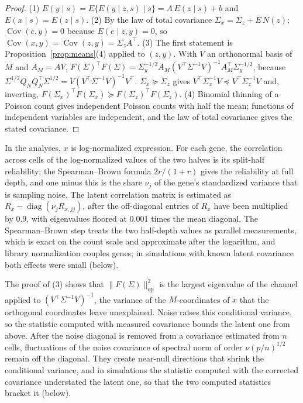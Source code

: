 \begin{proof}
(1) $E(y\mid s)=E\{E(y\mid z,s)\mid s\}=A\,E(z\mid s)+b$ and
$E(x\mid s)=E(z\mid s)$. (2) By the law of total covariance
$\Sigma_x=\Sigma_z+E\,N(z)$; $\operatorname{Cov}(e,y)=0$ because
$E(e\mid z,y)=0$, so $\operatorname{Cov}(x,y)=\operatorname{Cov}(z,y)
=\Sigma_zA^\top$. (3) The first statement is Proposition~\ref{prop:means}(4)
applied to $(z,y)$. With $V$ an orthonormal basis of $M$ and $A_M=AV$,
$F(\Sigma)^\top F(\Sigma)=\Sigma_y^{-1/2}A_M(V^\top\Sigma^{-1}V)^{-1}A_M^\top\Sigma_y^{-1/2}$,
because $\Sigma^{1/2}Q_NQ_N^\top\Sigma^{1/2}=V(V^\top\Sigma^{-1}V)^{-1}V^\top$.
$\Sigma_x\succeq\Sigma_z$ gives $V^\top\Sigma_x^{-1}V\preceq V^\top\Sigma_z^{-1}V$
and, inverting, $F(\Sigma_x)^\top F(\Sigma_x)\succeq F(\Sigma_z)^\top F(\Sigma_z)$.
(4) Binomial thinning of a Poisson count gives independent Poisson counts with
half the mean; functions of independent variables are independent, and the
law of total covariance gives the stated covariance.
\end{proof}

In the analyses, $x$ is log-normalized expression. For each gene, the
correlation across cells of the log-normalized values of the two halves is its
split-half reliability; the Spearman--Brown formula $2r/(1+r)$ gives the
reliability at full depth, and one minus this is the share $\nu_j$ of the
gene's standardized variance that is sampling noise. The latent correlation
matrix is estimated as $R_x-\operatorname{diag}(\nu_jR_{x,jj})$, after the off-diagonal entries of $R_x$
have been multiplied by 0.9, with eigenvalues floored at 0.001 times the mean diagonal. The Spearman--Brown step treats the two
half-depth values as parallel measurements, which is exact on the count scale
and approximate after the logarithm, and library normalization couples genes;
in simulations with known latent covariance both effects were small
(below).

The proof of (3) shows that $\|F(\Sigma)\|^2_{\mathrm{op}}$ is the largest
eigenvalue of the channel applied to $(V^\top\Sigma^{-1}V)^{-1}$, the variance
of the $M$-coordinates of $x$ that the orthogonal coordinates leave unexplained.
Noise raises this conditional variance, so the statistic computed with measured
covariance bounds the latent one from above. After the noise diagonal is removed
from a covariance estimated from $n$ cells, fluctuations of the noise covariance
of spectral norm of order $\nu(p/n)^{1/2}$ remain off the diagonal\cite{marchenko1967}.
They create near-null directions that shrink the conditional variance, and in
simulations the statistic computed with the corrected covariance understated
the latent one, so that the two computed statistics bracket it
(below).

